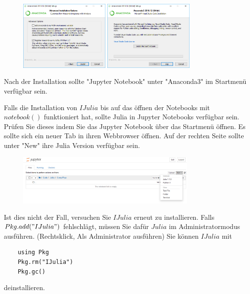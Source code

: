 \documentclass[11pt, a4paper]{scrartcl}
\begin{document}
\begin{figure}[H]
	\centering
	\includegraphics[width=0.4\textwidth]{img/install3.png}
	\vspace{0.1\textwidth}
	\includegraphics[width=0.4\textwidth]{img/install4.png}
\end{figure}

Nach der Installation sollte "Jupyter Notebook" unter "Anaconda3" im Startmenü verfügbar sein.

Falls die Installation von $IJulia$ bis auf das öffnen der Notebooks mit $notebook()$ funktioniert hat, sollte Julia in Jupyter Notebooks verfügbar sein. Prüfen Sie dieses indem Sie das Jupyter Notebook über das Startmenü öffnen. Es sollte sich ein neuer Tab in ihren Webbrowser öffnen. Auf der rechten Seite sollte unter "New" ihre Julia Version verfügbar sein.

\begin{figure}[h!]
	\centering
	\includegraphics[width=0.8\textwidth]{img/notebook.png}
\end{figure}

Ist dies nicht der Fall, versuchen Sie $IJulia$ erneut zu installieren. Falls $Pkg.add("IJulia")$ fehlschlägt, müssen Sie dafür $Julia$ im Administratormodus ausführen. (Rechtsklick, Als Administrator ausführen) Sie können $IJulia$ mit 
\begin{lstlisting}
	using Pkg
	Pkg.rm("IJulia")
	Pkg.gc()
\end{lstlisting}
deinstallieren.\textbf{}
\end{document}
